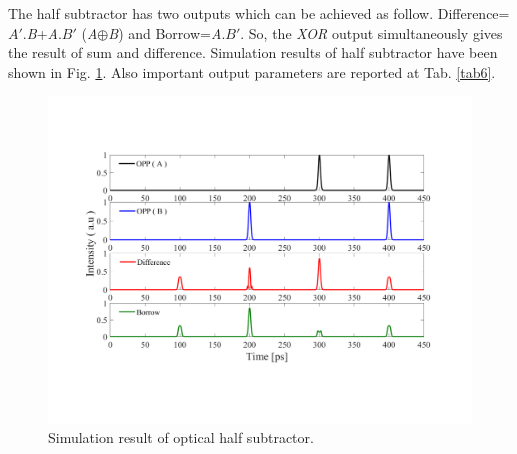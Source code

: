 \documentclass{osa-article}
\begin{document}
The half subtractor has two outputs which can be achieved as follow. Difference=$A'$.\textit {B}+\textit {A}.$B'$ (\textit {A}$\oplus$\textit {B}) and Borrow=\textit {A}.$B'$. So, the \textit{XOR} output simultaneously gives the result of sum and difference. Simulation results of half subtractor have been shown in Fig. \ref{fig6_subtractor}. Also important output parameters are reported at Tab. \ref{tab6}.
   \begin{figure}[tb]
\centering
\includegraphics[width=5 in]{figs/fig6_subtractor.pdf}
	\caption{Simulation result of optical half subtractor.}
	\label{fig6_subtractor}
\end{figure}

\begin{table}[H]
\caption{The parameters of flower-like structure  as half subtractor.}
\centering 
{}
\label{tab6} %
\end{table}
\end{document}
